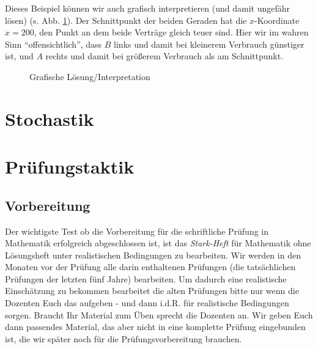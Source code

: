 \documentclass[a4paper]{book}%
\theoremstyle{definition}
\begin{document}
Dieses Beispiel können wir auch grafisch interpretieren (und damit ungefähr lösen) (s. Abb. \ref{fig:lineareGleichungen1}). Der Schnittpunkt der beiden Geraden hat die $x$-Koordinate $x=200$, den Punkt an dem beide Verträge gleich teuer sind. Hier wir im wahren Sinn \enquote{offensichtlich}, dass $B$ links und damit bei kleinerem Verbrauch günstiger ist, und $A$ rechts und damit bei größerem Verbrauch als am Schnittpunkt.
\begin{figure}
  \centering
  \caption{Grafische Lösung/Interpretation}\label{fig:lineareGleichungen1}
\end{figure}


\chapter{Stochastik}


\chapter{Prüfungstaktik}

\section{Vorbereitung}

Der wichtigste Test ob die Vorbereitung für die schriftliche Prüfung in Mathematik erfolgreich abgeschlossen ist, ist das \textit{Stark-Heft} für Mathematik ohne Lösungsheft unter realistischen Bedingungen zu bearbeiten. Wir werden in den Monaten vor der Prüfung alle darin enthaltenen Prüfungen (die tatsächlichen Prüfungen der letzten fünf Jahre) bearbeiten. Um dadurch eine realistische Einschätzung zu bekommen bearbeitet die alten Prüfungen bitte nur wenn die Dozenten Euch das aufgeben - und dann i.d.R. für realistische Bedingungen sorgen. Braucht Ihr Material zum Üben sprecht die Dozenten an. Wir geben Euch dann passendes Material, das aber nicht in eine komplette Prüfung eingebunden ist, die wir später noch für die Prüfungsvorbereitung brauchen.
\end{document}
